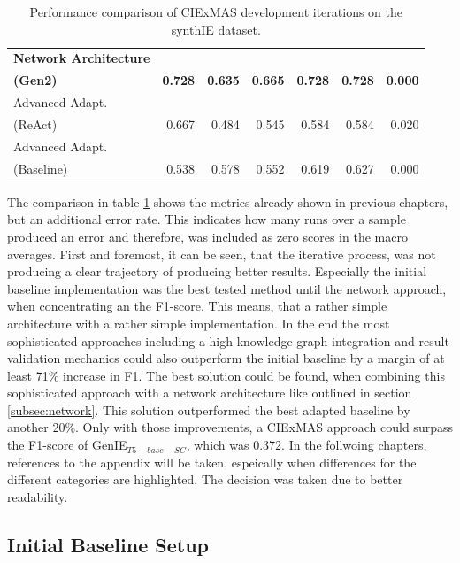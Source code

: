 \documentclass[a4paper,oneside,bibliography=totoc]{scrbook}
\begin{document}
\begin{table}[h]
\begin{tabular}{p{5cm}|rrrrrr}
    \textbf{Network Architecture}                                                                                                  \\\textbf{(Gen2)} & \textbf{0.728} & \textbf{0.635} & \textbf{0.665} & \textbf{0.728} & \textbf{0.728} & \textbf{0.000} \\
    Advanced Adapt.                                                                                                                \\(ReAct) & 0.667 & 0.484 & 0.545 & 0.584 & 0.584 & 0.020 \\
    Advanced Adapt.                                                                                                                \\(Baseline) & 0.538 & 0.578 & 0.552 & 0.619 & 0.627 & 0.000 \\
    \bottomrule
  \end{tabular}
  \caption{Performance comparison of CIExMAS development iterations on the synthIE dataset.}
  \label{tab:evaluation_iterations}
\end{table}

The comparison in table \ref{tab:evaluation_iterations} shows the metrics already shown in previous chapters, but an additional error rate. This indicates how many runs over a sample produced an error and therefore, was included as zero scores in the macro averages. First and foremost, it can be seen, that the iterative process, was not producing a clear trajectory of producing better results. Especially the initial baseline implementation was the best tested method until the network approach, when concentrating an the F1-score. This means, that a rather simple architecture with a rather simple implementation.
In the end the most sophisticated approaches including a high knowledge graph integration and result validation mechanics could also outperform the initial baseline by a margin of at least 71\% increase in F1. The best solution could be found, when combining this sophisticated approach with a network architecture like outlined in section \ref{subsec:network}. This solution outperformed the best adapted baseline by another 20\%. Only with those improvements, a CIExMAS approach could surpass the F1-score of GenIE$_{T5-base-SC}$, which was 0.372. In the follwoing chapters, references to the appendix will be taken, espeically when differences for the different categories are highlighted. The decision was taken due to better readability.

\subsection{Initial Baseline Setup}
\label{subsec:initial_baseline_setup}
\end{document}
